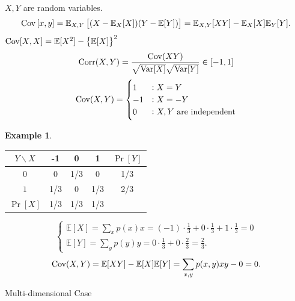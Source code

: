 \documentclass[12pt,openany]{book}
\theoremstyle{definition}
\newtheorem{example}{Example}[chapter]
\newcommand{\E}{\mathbb{E}}
\newcommand{\Cov}{\textnormal{Cov}}
\newcommand{\corr}{\textnormal{Corr}}
\newcommand{\Var}{\textnormal{Var}}
\begin{document}
	$X,Y$ are random variables. \[
	\Cov\sbr{x,y}=\E_{X,Y}\sbr{(X-\E_X[X])(Y-\E[Y])}=\E_{X,Y}[XY]-\E_X[X]\E_Y[Y].
	\]
	$\Cov[X,X]=\E[X^2]-\set{\E[X]}^2$
	\[
	\corr(X,Y)=\frac{\Cov(XY)}{\sqrt{\Var[X]}\sqrt{\Var[Y]}}\in\sbr{-1,1}
	\]\[
	\Cov(X,Y)=\begin{cases}
		1 &: X=Y\\
		-1&: X=-Y\\
		0 &: \text{$X,Y$ are independent}
	\end{cases}
	\]
	\begin{example}
		\ \begin{center}
			\begin{tabular}{c|ccc|c}
				$Y\backslash X$ & -1 & 0 & 1 & $\Pr[Y]$\\
				\hline
				$0$ & 0 & 1/3 & 0 & 1/3\\
				$1$ & 1/3 & 0 & 1/3 & 2/3\\
				\hline
				$\Pr[X]$ & 1/3 & 1/3 & 1/3 &
			\end{tabular}
		\end{center}\[
	\begin{cases}
		\E[X]=\sum_xp(x)x=(-1)\cdot\frac{1}{3}+0\cdot\frac{1}{3}+1\cdot\frac{1}{3}=0\\
		\E[Y]=\sum_yp(y)y=0\cdot\frac{1}{3}+0\cdot\frac{2}{3}=\frac{2}{3}.
	\end{cases}
	\] \[
	\Cov(X,Y)=\E[XY]-\E[X]\E[Y]=\sum_{x,y}p(x,y)xy-0=0.
	\]
	\end{example}

	Multi-dimensional Case
	
\end{document}
